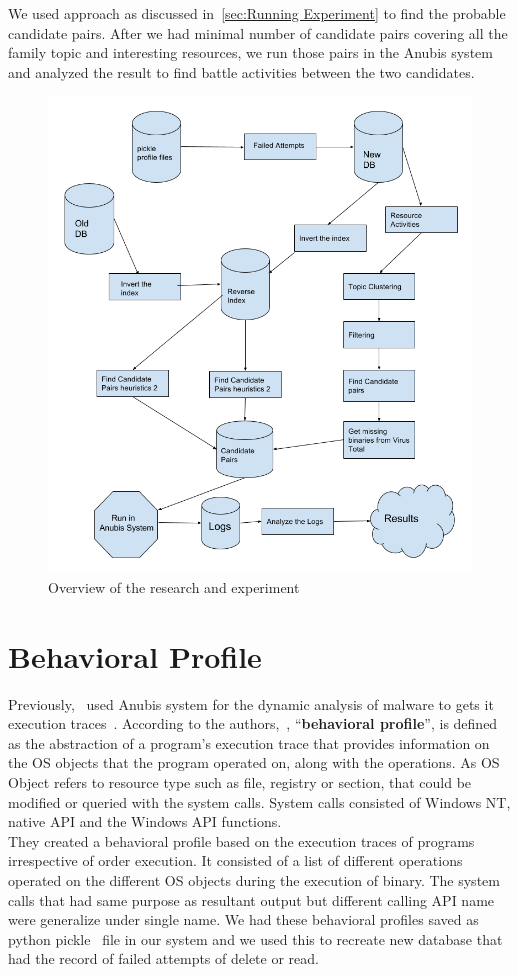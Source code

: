 We used approach as discussed in~\autoref{sec:Running Experiment} to find the probable candidate pairs.
After we had minimal number of candidate pairs covering all the family topic and interesting resources, we run those pairs in the Anubis system and analyzed the result to find battle activities between the two candidates.
\begin{figure}[htbp]
  \centering
  \includegraphics[scale=0.4]{figures/bigpicture.png}
  \caption[Big Picture]{Overview of the research and experiment}\label{fig:bigpicture}
\end{figure}
\section{Behavioral Profile}
\label{sec:Behavioral Profile}
Previously,~\citeauthor{bayer} used Anubis system for the dynamic analysis of malware to gets it execution traces~\cite[]{bayer}.
According to the authors,~\citeauthor{bayer}, ``\textbf{behavioral profile}'', is defined as the abstraction of a program's execution trace that provides information on the OS objects that the program operated on, along with the operations.
As OS Object refers to resource type such as file, registry or section, that could be modified or queried with the system calls.
System calls consisted of Windows NT, native API and the Windows API functions.\\
They created a behavioral profile based on the execution traces of programs irrespective of order execution.
It consisted of a list of different operations operated on the different OS objects during the execution of binary.
The system calls that had same purpose as resultant output but different calling API name were generalize under single name.
We had these behavioral profiles saved as python pickle~\cite[]{pythonpickle} file in our system and we used this to recreate new database that had the record of failed attempts of delete or read.\\
